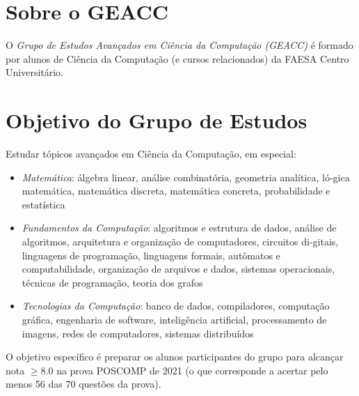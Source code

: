 \documentclass[a4paper]{inzane_syllabus} %
\begin{document}

\makeprofile 


\section{Sobre o GEACC}

O \emph{Grupo de Estudos Avançados em Ciência da Computação (GEACC)} é
formado por alunos de Ciência da Computação (e cursos relacionados) da
FAESA Centro Universitário.


\vspace{0.5cm} 
\section{Objetivo do Grupo de Estudos}

Estudar tópicos avançados em Ciência da Computação, em especial:
\begin{itemize}
\item \emph{Matemática}: álgebra linear, análise combinatória, geometria
analítica, ló-gica matemática, matemática discreta, matemática
concreta, probabilidade e estatística
\item \emph{Fundamentos da Computação}: algoritmos e estrutura de dados, análise
de algoritmos, arquitetura e organização de computadores, circuitos di-gitais,
linguagens de programação, linguagens formais, autômatos e computabilidade,
organização de arquivos e dados, sistemas operacionais, técnicas de programação,
teoria dos grafos
\item \emph{Tecnologias da Computação}: banco de dados, compiladores, computação
gráfica, engenharia de software, inteligência artificial, processamento de imagens,
redes de computadores, sistemas distribuídos
\end{itemize}

O objetivo específico é preparar
os alunos participantes do grupo para alcançar nota $\ge 8.0$ na prova POSCOMP
de 2021 (o que corresponde a acertar pelo menos 56 das 70 questões da prova).
\end{document}
